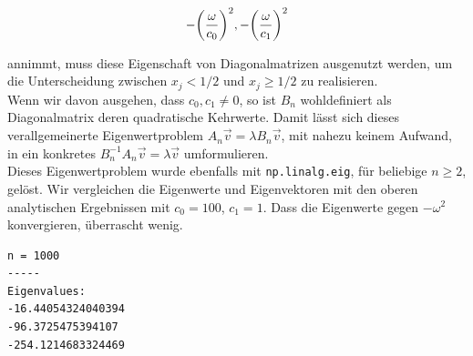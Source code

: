 \begin{align*}
  -{\left ( \frac{\omega}{c_0} \right )}^2, -{\left ( \frac{\omega}{c_1} \right )}^2
\end{align*}

annimmt, muss diese Eigenschaft von Diagonalmatrizen ausgenutzt werden, um die Unterscheidung zwischen $x_j < 1/2$ und $x_j \geq 1/2$ zu realisieren. \\

Wenn wir davon ausgehen, dass $c_0, c_1 \neq 0$, so ist $B_n$ wohldefiniert als Diagonalmatrix deren quadratische Kehrwerte. Damit lässt sich dieses verallgemeinerte Eigenwertproblem $A_n \vec v = \lambda B_n \vec v$, mit nahezu keinem Aufwand, in ein konkretes $B_n^{-1} A_n \vec v = \lambda \vec v$ umformulieren. \\

Dieses Eigenwertproblem wurde ebenfalls mit \verb|np.linalg.eig|, für beliebige $n \geq 2$, gelöst. Wir vergleichen die Eigenwerte und Eigenvektoren mit den oberen \glqq analytischen\grqq{} Ergebnissen mit $c_0 = 100$, $c_1 = 1$. Dass die Eigenwerte gegen $-\omega^2$ konvergieren, überrascht wenig. \\

\begin{verbatim}
n = 1000
-----
Eigenvalues:
-16.44054324040394
-96.3725475394107
-254.1214683324469
\end{verbatim}
